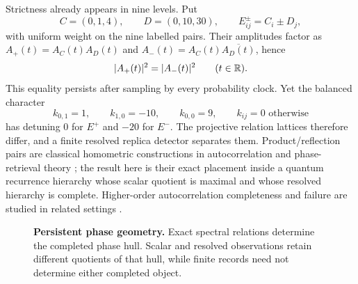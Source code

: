 Strictness already appears in nine levels.  Put
\begin{equation}
 C=(0,1,4),\qquad D=(0,10,30),\qquad
 E^{\pm}_{ij}=C_i\pm D_j,                              \label{eq:homometricpair}
\end{equation}
with uniform weight on the nine labelled pairs.  Their amplitudes factor as
$A_+(t)=A_C(t)A_D(t)$ and
$A_-(t)=A_C(t)\overline{A_D(t)}$, hence
\begin{equation}
 |A_+(t)|^2=|A_-(t)|^2\qquad(t\in\mathbb R).                 \label{eq:homometricfidelity}
\end{equation}
This equality persists after sampling by every probability clock.  Yet the
balanced character
\begin{equation}
 k_{0,1}=1,\qquad k_{1,0}=-10,\qquad k_{0,0}=9,
 \qquad k_{ij}=0\text{ otherwise}                    \label{eq:witnesscharacter}
\end{equation}
has detuning $0$ for $E^+$ and $-20$ for $E^-$.  The projective relation
lattices therefore differ, and a finite resolved replica detector separates
them.  Product/reflection pairs are classical homometric constructions in
autocorrelation and phase-retrieval theory
\cite{RosenblattSeymour1982,GrimmBaake2008}; the result here is their exact
placement inside a quantum recurrence hierarchy whose scalar quotient is
maximal and whose resolved hierarchy is complete.  Higher-order
autocorrelation completeness and failure are studied in related settings
\cite{YellottIverson1992,AgulnickBusickWarner2026}.

\begin{figure}[H]
\centering
{}
\caption{\textbf{Persistent phase geometry.}  Exact spectral relations
determine the completed phase hull.  Scalar and resolved observations retain
different quotients of that hull, while finite records need not determine
either completed object.}
\label{fig:architecture}
\end{figure}

